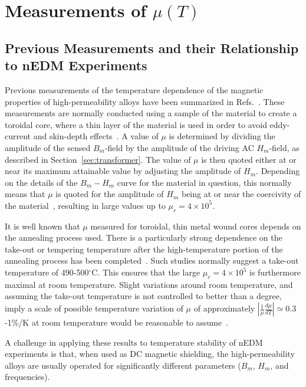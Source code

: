\documentclass[review]{elsarticle}
\begin{document}
\section{Measurements of $\mu(T)$\label{sec:tdep}}

\subsection{Previous Measurements and their Relationship to nEDM Experiments\label{sec:previousmeasurement}}

Previous measurements of the temperature dependence of the magnetic
properties of high-permeability alloys have been summarized in
Refs.~\cite{bib:pfeifer,bib:bozorth,bib:couderchon}.  These
measurements are normally conducted using a sample of the material to
create a toroidal core, where a thin layer of the material is used in
order to avoid eddy-current and skin-depth
effects~\cite{bib:pfeifer,bib:kruppvdm}.  A value of $\mu$ is
determined by dividing the amplitude of the sensed $B_m$-field by the
amplitude of the driving AC $H_m$-field, as described in
Section~\ref{sec:transformer}.  The value of $\mu$ is then quoted
either at or near its maximum attainable value by adjusting the
amplitude of $H_m$.  Depending on the details of the $B_m-H_m$ curve
for the material in question, this normally means that $\mu$ is quoted
for the amplitude of $H_m$ being at or near the coercivity of the
material~\cite{bib:couderchon,bib:kruppvdm}, resulting in large values
up to $\mu_r=4\times 10^5$.

It is well known that $\mu$ measured for toroidal, thin metal wound
cores depends on the annealing process used.  There is a particularly
strong dependence on the take-out or tempering temperature after the
high-temperature portion of the annealing process has been
completed~\cite{bib:pfeifer,bib:kruppvdm,bib:couderchon}.  Such
studies normally suggest a take-out temperature of 490-500$^\circ$C.
This ensures that the large $\mu_r=4\times 10^{5}$ is furthermore
maximal at room temperature.  Slight variations around room
temperature, and assuming the take-out temperature is not controlled
to better than a degree, imply a scale of possible temperature
variation of $\mu$ of approximately
$\left|\frac{1}{\mu}\frac{d\mu}{dT}\right|\simeq 0.3$-1\%/K at room temperature
would be reasonable to assume~\cite{bib:couderchon,bib:kruppvdm}.

A challenge in applying these results to temperature stability of nEDM
experiments is that, when used as DC magnetic shielding, the
high-permeability alloys are usually operated for significantly
different parameters ($B_m$, $H_m$, and frequencies).
\end{document}
